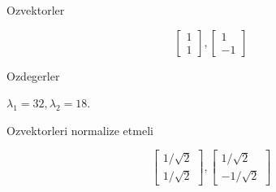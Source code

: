 \documentclass[12pt,fleqn]{article}\usepackage{../common}
\begin{document}
Ozvektorler

\[ 
\left[\begin{array}{r}
1 \\ 1
\end{array}\right],
\left[\begin{array}{r}
1 \\ -1
\end{array}\right]
 \]

Ozdegerler

$\lambda_1=32, \lambda_2=18$. 

Ozvektorleri normalize etmeli

\[ 
\left[\begin{array}{r}
1 / \sqrt{ 2} \\ 1/ \sqrt{ 2}
\end{array}\right],
\left[\begin{array}{r}
1/ \sqrt{ 2} \\ -1/ \sqrt{ 2}
\end{array}\right]
 \]
\end{document}
